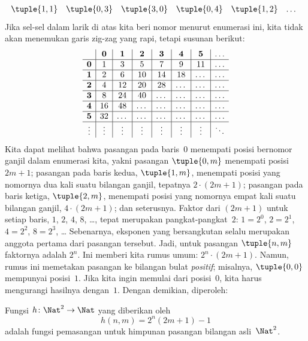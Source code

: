 \documentclass[../../../include/open-logic-section]{subfiles}
\begin{document}
\begin{explain}
\[\begin{array}{@{}cc c c c c c c c c c@{}}
\tuple{1,1} & \tuple{0,3} & \tuple{3,0}  & \tuple{0,4} &  \tuple{1,2} & \dots \\
\end{array}
\]
Jika sel-sel dalam larik di atas kita beri nomor menurut enumerasi ini, kita
tidak akan menemukan garis zig-zag yang rapi, tetapi susunan berikut:
\[
\begin{array}{ c | c | c | c | c | c | c | c }
& \mathbf 0 & \mathbf 1 & \mathbf 2 & \mathbf 3 & \mathbf 4 & \mathbf 5 & \dots \\
\hline
\mathbf 0 & 1 & 3 & 5 & 7 & 9 & 11 & \dots \\
\hline
\mathbf 1 & 2 & 6 & 10 & 14 & 18 & \dots & \dots \\
\hline
\mathbf 2 & 4 & 12 & 20 & 28 & \dots & \dots & \dots \\
\hline
\mathbf 3 & 8 & 24 & 40 & \dots & \dots & \dots & \dots \\
\hline
\mathbf 4 & 16 & 48 & \dots & \dots & \dots & \dots & \dots \\
\hline
\mathbf 5 & 32 & \dots & \dots & \dots & \dots & \dots & \dots \\
\hline
\vdots & \vdots & \vdots & \vdots & \vdots & \vdots & \vdots & \ddots\\
\end{array}
\]
Kita dapat melihat bahwa pasangan pada baris~$0$ menempati posisi bernomor
ganjil dalam enumerasi kita, yakni pasangan $\tuple{0,m}$ menempati posisi
$2m+1$; pasangan pada baris kedua, $\tuple{1,m}$, menempati posisi yang
nomornya dua kali suatu bilangan ganjil, tepatnya $2 \cdot (2m+1)$; pasangan
pada baris ketiga, $\tuple{2,m}$, menempati posisi yang nomornya empat kali
suatu bilangan ganjil, $4 \cdot (2m+1)$; dan seterusnya. Faktor dari $(2m+1)$
untuk setiap baris, $1$, $2$, $4$, $8$, \dots, tepat merupakan
pangkat-pangkat~$2$: $1= 2^0$, $2 = 2^1$, $4 = 2^2$, $8 = 2^3$, \dots\@
Sebenarnya, eksponen yang bersangkutan selalu merupakan anggota pertama dari
pasangan tersebut. Jadi, untuk pasangan $\tuple{n,m}$ faktornya adalah $2^n$.
Ini memberi kita rumus umum: $2^n \cdot (2m+1)$. Namun, rumus ini memetakan
pasangan ke bilangan bulat \emph{positif}; misalnya, $\tuple{0,0}$ mempunyai
posisi~$1$. Jika kita ingin memulai dari posisi~$0$, kita harus mengurangi
hasilnya dengan~$1$. Dengan demikian, diperoleh:
\end{explain}

\begin{ex}
Fungsi $h\colon \Nat^2 \to \Nat$ yang diberikan oleh
\[
h(n,m) = 2^n (2m+1) - 1
\]
adalah fungsi pemasangan untuk himpunan pasangan bilangan asli~$\Nat^2$.
\end{ex}
\end{document}
